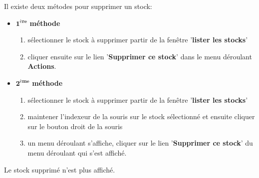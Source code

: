 Il existe deux m\'etodes pour supprimer un stock:
\begin{itemize}[]
	\item \textcolor{purplish}{$\mathbf{1^{\text{\`ere}}}$ \textbf{m\'ethode}}
	
	\begin{enumerate}[1)]
		\item s\'electionner le stock \`a supprimer partir de
		la fen\^etre '\textbf{lister les stocks}'
		
		\item cliquer ensuite sur le lien '\textbf{Supprimer ce stock}'
		dans le menu d\'eroulant \textbf{Actions}.\\
	\end{enumerate}
	
	\item \textcolor{purplish}{$\mathbf{2^{\text{\`eme}}}$ \textbf{m\'ethode}}
	\begin{enumerate}[1)]
		\item s\'electionner le stock \`a supprimer partir de
			la fen\^etre '\textbf{lister les stocks}'
		
		\item maintener l'indexeur de la souris sur le stock
			s\'electionn\'e et ensuite cliquer sur le bouton
			droit de la souris
				
		\item un menu d\'eroulant s'affiche, cliquer sur
			le lien '\textbf{Supprimer ce stock}' du menu
			d\'eroulant qui s'est affich\'e. \\
	\end{enumerate}	
\end{itemize}

Le stock supprim\'e n'est plus affich\'e.
